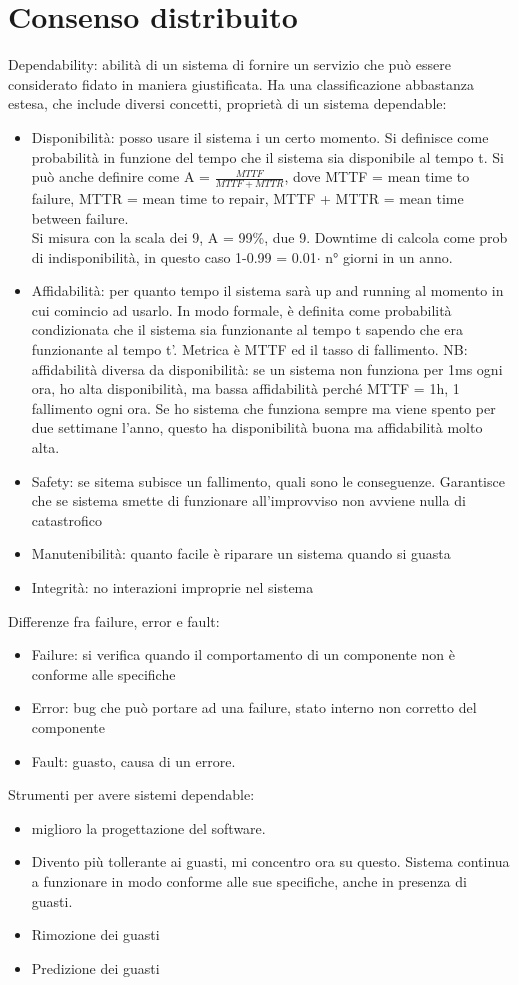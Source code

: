 \documentclass[16px]{article}
\begin{document}
\section{Consenso distribuito}
Dependability: abilità di un sistema di fornire un servizio che può essere considerato fidato in maniera giustificata. Ha una classificazione abbastanza estesa, che include diversi concetti, proprietà di un sistema dependable:
\begin{itemize}
\item Disponibilità: posso usare il sistema i un certo momento. Si definisce come probabilità in funzione del tempo che il sistema sia disponibile al tempo t. Si può anche definire come A = $\frac{MTTF}{MTTF + MTTR}$, dove MTTF = mean time to failure, MTTR = mean time to repair, MTTF + MTTR = mean time between failure.\\ Si misura con la scala dei 9, A = 99\%, due 9. Downtime di calcola come prob di indisponibilità, in questo caso 1-0.99 = 0.01$\cdot$ n° giorni in un anno.
\item Affidabilità: per quanto tempo il sistema sarà up and running al momento in cui comincio ad usarlo. In modo formale, è definita come probabilità condizionata che il sistema sia funzionante al tempo t sapendo che era funzionante al tempo t'. Metrica è MTTF ed il tasso di fallimento. NB: affidabilità diversa da disponibilità: se un sistema non funziona per 1ms ogni ora, ho alta disponibilità, ma bassa affidabilità perché MTTF = 1h, 1 fallimento ogni ora. Se ho sistema che funziona sempre ma viene spento per due settimane l'anno, questo ha disponibilità buona ma affidabilità molto alta.
\item Safety: se sitema subisce un fallimento, quali sono le conseguenze. Garantisce che se sistema smette di funzionare all'improvviso non avviene nulla di catastrofico
\item Manutenibilità: 	quanto facile è riparare un sistema quando si guasta
\item Integrità: no interazioni improprie nel sistema
\end{itemize}
Differenze fra failure, error e fault:
\begin{itemize}
\item Failure: si verifica quando il comportamento di un componente non è conforme alle specifiche
\item Error: bug che può portare ad una failure, stato interno non corretto del componente 
\item Fault: guasto, causa di un errore.
\end{itemize}
Strumenti per avere sistemi dependable: 
\begin{itemize}
\item miglioro la progettazione del software.
\item Divento più tollerante ai guasti, mi concentro ora su questo. Sistema continua a funzionare in modo conforme alle sue specifiche, anche in presenza di guasti.
\item Rimozione dei guasti
\item Predizione dei guasti
\end{itemize}
\end{document}
